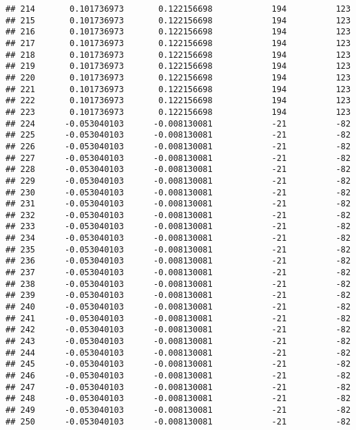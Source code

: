 \documentclass[]{article}
\begin{document}
\begin{verbatim}
## 214       0.101736973       0.122156698            194          123
## 215       0.101736973       0.122156698            194          123
## 216       0.101736973       0.122156698            194          123
## 217       0.101736973       0.122156698            194          123
## 218       0.101736973       0.122156698            194          123
## 219       0.101736973       0.122156698            194          123
## 220       0.101736973       0.122156698            194          123
## 221       0.101736973       0.122156698            194          123
## 222       0.101736973       0.122156698            194          123
## 223       0.101736973       0.122156698            194          123
## 224      -0.053040103      -0.008130081            -21          -82
## 225      -0.053040103      -0.008130081            -21          -82
## 226      -0.053040103      -0.008130081            -21          -82
## 227      -0.053040103      -0.008130081            -21          -82
## 228      -0.053040103      -0.008130081            -21          -82
## 229      -0.053040103      -0.008130081            -21          -82
## 230      -0.053040103      -0.008130081            -21          -82
## 231      -0.053040103      -0.008130081            -21          -82
## 232      -0.053040103      -0.008130081            -21          -82
## 233      -0.053040103      -0.008130081            -21          -82
## 234      -0.053040103      -0.008130081            -21          -82
## 235      -0.053040103      -0.008130081            -21          -82
## 236      -0.053040103      -0.008130081            -21          -82
## 237      -0.053040103      -0.008130081            -21          -82
## 238      -0.053040103      -0.008130081            -21          -82
## 239      -0.053040103      -0.008130081            -21          -82
## 240      -0.053040103      -0.008130081            -21          -82
## 241      -0.053040103      -0.008130081            -21          -82
## 242      -0.053040103      -0.008130081            -21          -82
## 243      -0.053040103      -0.008130081            -21          -82
## 244      -0.053040103      -0.008130081            -21          -82
## 245      -0.053040103      -0.008130081            -21          -82
## 246      -0.053040103      -0.008130081            -21          -82
## 247      -0.053040103      -0.008130081            -21          -82
## 248      -0.053040103      -0.008130081            -21          -82
## 249      -0.053040103      -0.008130081            -21          -82
## 250      -0.053040103      -0.008130081            -21          -82

\end{verbatim}
\end{document}

